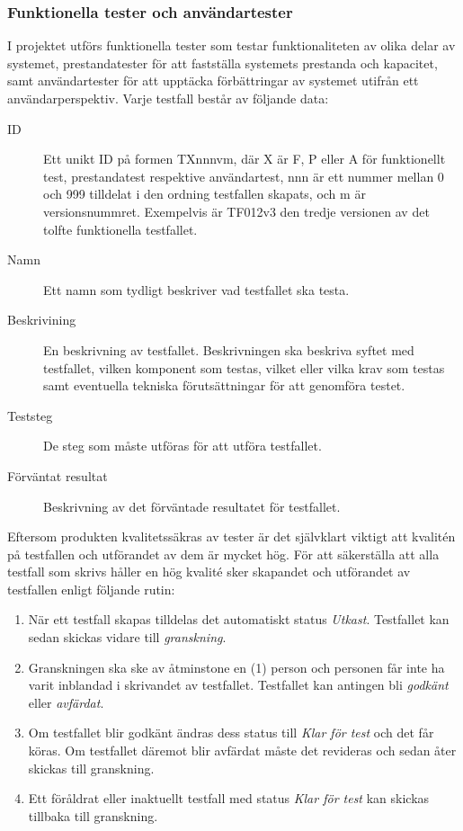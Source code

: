\subsubsection*{Funktionella tester och användartester}

I projektet utförs funktionella tester som testar funktionaliteten av olika delar av systemet, prestandatester för att fastställa systemets prestanda och kapacitet, samt användartester för att upptäcka förbättringar av systemet utifrån ett användarperspektiv. Varje testfall består av följande data:

\begin{description}
  \item [ID] Ett unikt ID på formen TXnnnvm, där X är F, P eller A för funktionellt test, prestandatest respektive användartest, nnn är ett nummer mellan 0 och 999 tilldelat i den ordning testfallen skapats, och m är versionsnummret. Exempelvis är TF012v3 den tredje versionen av det tolfte funktionella testfallet.
  \item [Namn] Ett namn som tydligt beskriver vad testfallet ska testa.
  \item [Beskrivining] En beskrivning av testfallet. Beskrivningen ska beskriva syftet med testfallet, vilken komponent som testas, vilket eller vilka krav som testas samt eventuella tekniska förutsättningar för att genomföra testet.
  \item [Teststeg] De steg som måste utföras för att utföra testfallet.
  \item [Förväntat resultat] Beskrivning av det förväntade resultatet för testfallet.
\end{description}

\noindent
Eftersom produkten kvalitetssäkras av tester är det självklart viktigt att kvalitén på testfallen och utförandet av dem är mycket hög. För att säkerställa att alla testfall som skrivs håller en hög kvalité sker skapandet och utförandet av testfallen enligt följande rutin:

\begin{enumerate}
\item När ett testfall skapas tilldelas det automatiskt status \textit{Utkast}. Testfallet kan sedan skickas vidare till \textit{granskning}.
\item Granskningen ska ske av åtminstone en (1) person och personen får inte ha varit inblandad i skrivandet av testfallet. Testfallet kan antingen bli \textit{godkänt} eller \textit{avfärdat}.
\item Om testfallet blir godkänt ändras dess status till \textit{Klar för test} och det får köras. Om testfallet däremot blir avfärdat måste det revideras och sedan åter skickas till granskning.
\item Ett föråldrat eller inaktuellt testfall med status \textit{Klar för test} kan skickas tillbaka till granskning.
\end{enumerate}

